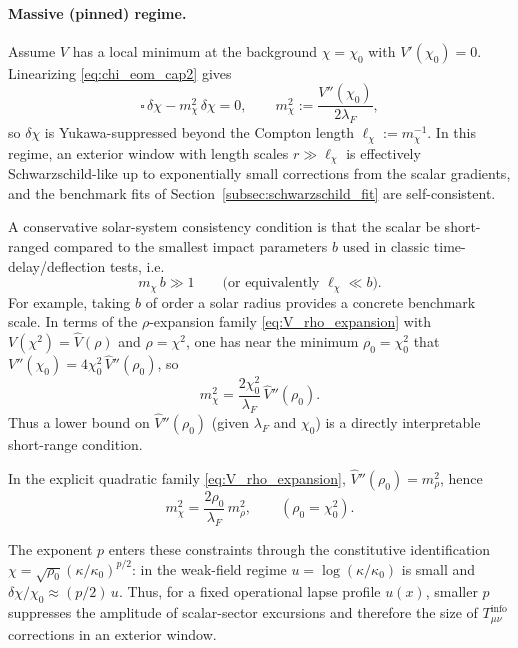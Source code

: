 \paragraph{Massive (pinned) regime.}
Assume $V$ has a local minimum at the background $\chi=\chi_0$ with $V'(\chi_0)=0$.
Linearizing \eqref{eq:chi_eom_cap2} gives
\begin{equation}
  \square\,\delta\chi - m_\chi^2\,\delta\chi = 0,
  \qquad
  m_\chi^2 := \frac{V''(\chi_0)}{2\lambda_F},
\end{equation}
so $\delta\chi$ is Yukawa-suppressed beyond the Compton length $\ell_\chi:=m_\chi^{-1}$.
In this regime, an exterior window with length scales $r\gg \ell_\chi$ is effectively Schwarzschild-like up to exponentially small corrections from the scalar gradients, and the benchmark fits of Section~\ref{subsec:schwarzschild_fit} are self-consistent.
\par
\noindent A conservative solar-system consistency condition is that the scalar be short-ranged compared to the smallest impact parameters $b$ used in classic time-delay/deflection tests, i.e.
\begin{equation}
  m_\chi\,b \gg 1
  \qquad\text{(or equivalently } \ell_\chi \ll b\text{)}.
\end{equation}
For example, taking $b$ of order a solar radius provides a concrete benchmark scale.
In terms of the $\rho$-expansion family \eqref{eq:V_rho_expansion} with $V(\chi^2)=\widehat V(\rho)$ and $\rho=\chi^2$, one has near the minimum $\rho_0=\chi_0^2$ that $V''(\chi_0)=4\chi_0^2\,\widehat V''(\rho_0)$, so
\begin{equation}
  m_\chi^2 = \frac{2\chi_0^2}{\lambda_F}\,\widehat V''(\rho_0).
\end{equation}
Thus a lower bound on $\widehat V''(\rho_0)$ (given $\lambda_F$ and $\chi_0$) is a directly interpretable short-range condition.
\par
\noindent In the explicit quadratic family \eqref{eq:V_rho_expansion}, $\widehat V''(\rho_0)=m_\rho^2$, hence
\begin{equation}
  m_\chi^2 = \frac{2\rho_0}{\lambda_F}\,m_\rho^2,
  \qquad (\rho_0=\chi_0^2).
\end{equation}
\par
\noindent The exponent $p$ enters these constraints through the constitutive identification $\chi=\sqrt{\rho_0}(\kappa/\kappa_0)^{p/2}$: in the weak-field regime $u=\log(\kappa/\kappa_0)$ is small and $\delta\chi/\chi_0 \approx (p/2)\,u$.
Thus, for a fixed operational lapse profile $u(x)$, smaller $p$ suppresses the amplitude of scalar-sector excursions and therefore the size of $T^{\mathrm{info}}_{\mu\nu}$ corrections in an exterior window.


